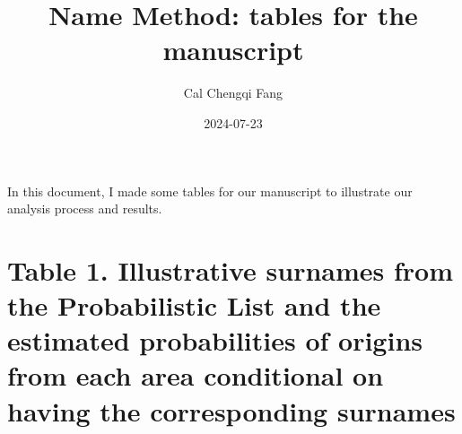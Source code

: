 \documentclass[
  landscape]{article}
\title{Name Method: tables for the manuscript}
\author{Cal Chengqi Fang}
\date{2024-07-23}
\begin{document}
\maketitle

In this document, I made some tables for our manuscript to illustrate
our analysis process and results.

\hypertarget{table-1.-illustrative-surnames-from-the-probabilistic-list-and-the-estimated-probabilities-of-origins-from-each-area-conditional-on-having-the-corresponding-surnames}{%
\section{Table 1. Illustrative surnames from the Probabilistic List and
the estimated probabilities of origins from each area conditional on
having the corresponding
surnames}\label{table-1.-illustrative-surnames-from-the-probabilistic-list-and-the-estimated-probabilities-of-origins-from-each-area-conditional-on-having-the-corresponding-surnames}}
\end{document}
